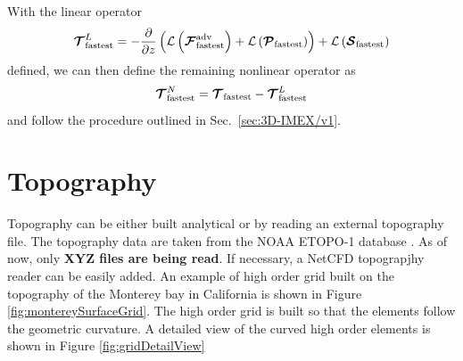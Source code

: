 \documentclass{article}
\begin{document}
With the linear operator
\[
\boldsymbol{{\mathcal{T}}}^L_{\mathrm{fastest}} = - \frac{\partial }{\partial z} \left( \mathcal{L}\left(\boldsymbol{{\mathcal{F}}}^{\mathrm{adv}}_{\mathrm{fastest}}\right) + \mathcal{L}\left(\boldsymbol{{\mathcal{P}}}_{\mathrm{fastest}}\right) \right) + \mathcal{L}\left( \boldsymbol{{\mathcal{S}}}_{\mathrm{fastest}}\right)
\]
defined, we can then define the remaining nonlinear operator as 
\[
\boldsymbol{{\mathcal{T}}}^N_{\mathrm{fastest}} =\boldsymbol{{\mathcal{T}}}_{\mathrm{fastest}} - \boldsymbol{{\mathcal{T}}}^L_{\mathrm{fastest}}
\]
and follow the procedure outlined in Sec.\ \ref{sec:3D-IMEX/v1}. 

\section{Topography}
Topography can be either built analytical or by reading an external topography file. The topography data are taken from the NOAA ETOPO-1 database \cite{etopo1}. As of now, only {\bf XYZ files are being read}. If necessary, a NetCFD topograpjhy reader can be easily added.
An example of high order grid built on the topography of the Monterey bay in California is shown in Figure \ref{fig:montereySurfaceGrid}. The high order grid is built so that the elements follow the geometric curvature. A detailed view of the curved high order elements is shown in Figure \ref{fig:gridDetailView}
\end{document}
